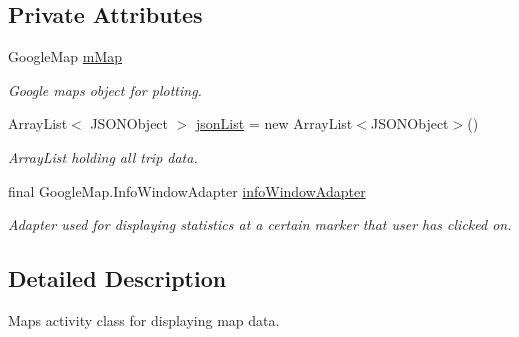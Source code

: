 \subsection*{Private Attributes}
\begin{DoxyCompactItemize}
\item 
\mbox{\label{classcom_1_1jack_1_1motorbikestatistics_1_1_maps_activity_aaace5219464acf3df9ac5e9ce913eef5}} 
Google\+Map \hyperlink{classcom_1_1jack_1_1motorbikestatistics_1_1_maps_activity_aaace5219464acf3df9ac5e9ce913eef5}{m\+Map}
\begin{DoxyCompactList}\small\item\em Google maps object for plotting. \end{DoxyCompactList}\item 
\mbox{\label{classcom_1_1jack_1_1motorbikestatistics_1_1_maps_activity_aaed26c36e08dad942830ab52d9d75d2e}} 
Array\+List$<$ J\+S\+O\+N\+Object $>$ \hyperlink{classcom_1_1jack_1_1motorbikestatistics_1_1_maps_activity_aaed26c36e08dad942830ab52d9d75d2e}{json\+List} = new Array\+List$<$J\+S\+O\+N\+Object$>$()
\begin{DoxyCompactList}\small\item\em Array\+List holding all trip data. \end{DoxyCompactList}\item 
\mbox{\label{classcom_1_1jack_1_1motorbikestatistics_1_1_maps_activity_ae1d8944364b8deb189ee2c40471616b5}} 
final Google\+Map.\+Info\+Window\+Adapter \hyperlink{classcom_1_1jack_1_1motorbikestatistics_1_1_maps_activity_ae1d8944364b8deb189ee2c40471616b5}{info\+Window\+Adapter}
\begin{DoxyCompactList}\small\item\em Adapter used for displaying statistics at a certain marker that user has clicked on. \end{DoxyCompactList}\end{DoxyCompactItemize}


\subsection{Detailed Description}
Maps activity class for displaying map data. 

